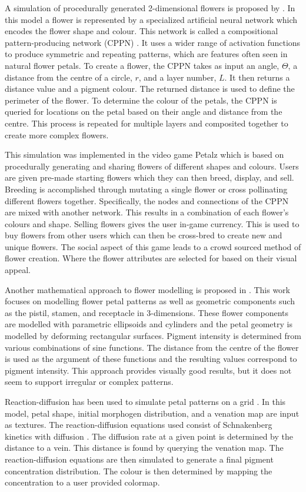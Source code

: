 A simulation of procedurally generated 2-dimensional flowers is proposed by \cite{risi2012}. In this model a flower is represented by a specialized artificial neural network which encodes the flower shape and colour. This network is called a compositional pattern-producing network (CPPN) \cite{stanley2007}. It uses a wider range of activation functions to produce symmetric and repeating patterns, which are features often seen in natural flower petals. To create a flower, the CPPN takes as input an angle, $\Theta$, a distance from the centre of a circle, $r$, and a layer number, $L$. It then returns a distance value and a pigment colour. The returned distance is used to define the perimeter of the flower. To determine the colour of the petals, the CPPN is queried for locations on the petal based on their angle and distance from the centre. This process is repeated for multiple layers and composited together to create more complex flowers. 

This simulation was implemented in the video game Petalz which is based on procedurally generating and sharing flowers of different shapes and colours. Users are given pre-made starting flowers which they can then breed, display, and sell. Breeding is accomplished through mutating a single flower or cross pollinating different flowers together. Specifically, the nodes and connections of the CPPN are mixed with another network. This results in a combination of each flower's colours and shape. Selling flowers gives the user in-game currency. This is used to buy flowers from other users which can then be cross-bred to create new and unique flowers. The social aspect of this game leads to a crowd sourced method of flower creation. Where the flower attributes are selected for based on their visual appeal.

Another mathematical approach to flower modelling is proposed in \cite{lu2014}. This work focuses on modelling flower petal patterns as well as geometric components such as the pistil, stamen, and receptacle in 3-dimensions. These flower components are modelled with parametric ellipsoids and cylinders and the petal geometry is modelled by deforming rectangular surfaces. Pigment intensity is determined from various combinations of sine functions. The distance from the centre of the flower is used as the argument of these functions and the resulting values correspond to pigment intensity. This approach provides visually good results, but it does not seem to support irregular or complex patterns.

Reaction-diffusion has been used to simulate petal patterns on a grid \cite{Zhou2007}. In this model, petal shape, initial morphogen distribution, and a venation map are input as textures. The reaction-diffusion equations used consist of Schnakenberg kinetics with diffusion \cite{schnakenberg1979}. The diffusion rate at a given point is determined by the distance to a vein. This distance is found by querying the venation map. The reaction-diffusion equations are then simulated to generate a final pigment concentration distribution. The colour is then determined by mapping the concentration to a user provided colormap.

